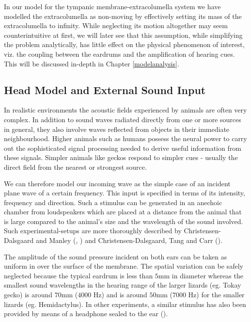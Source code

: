 In our model for the tympanic membrane-extracolumella system we have modelled the extracolumella 
as non-moving by effectively setting its mass of the extracolumella to infinity. While neglecting its motion altogether may seem counterintuitive at first, 
we will later see that this assumption, while simplifying the problem analytically,  has little effect on the physical phenomenon of interest, viz. the coupling between
the eardrums and the amplification of hearing cues. This will be discussed in-depth in Chapter \ref{modelanalysis}.

\subsection{Head Model and External Sound Input}\label{soundinput}
In realistic environments the acoustic fields experienced by animals are often very complex.
In addition to sound waves radiated directly from one or more sources in general, they also involve
waves reflected from objects in their immediate neighbourhood. Higher animals such as humans
possess the neural power to carry out the sophisticated signal processing needed to derive useful
information from these signals. Simpler animals like geckos respond to simpler cues - usually
the direct field from the nearest or strongest source.

We can therefore model our incoming wave as the simple case of an incident plane wave of a 
certain frequency. This input is specified in terms of its intensity, frequency and direction.
Such a stimulus can be generated in an anechoic chamber from loudspeakers which are placed at
a distance from the animal that is large compared to the animal's size and the wavelength
of the sound involved. Such experimental-setups are more thoroughly described by 
Christensen-Dalsgaard and Manley (\cite{dalsgaardmanley1}, \cite{dalsgaardmanley2}) and 
Christensen-Dalsgaard, Tang and Carr (\cite{dalsgaardtangcarr}).

The amplitude of the sound pressure incident on both ears can be taken as uniform in over 
the surface of the membrane. The spatial variation can be safely neglected because the
typical eardrum is less than $5$mm in diameter whereas the smallest sound wavelengths
in the hearing range of the larger lizards (eg. Tokay gecko) is around $70$mm ($4000$ Hz) 
and is around $50$mm ($7000$ Hz) for the smaller lizards (eg. Hemidactylus). In other
experiments, a similar stimulus has also been provided by means of a headphone sealed
to the ear (\cite{koepplcarr1}).

